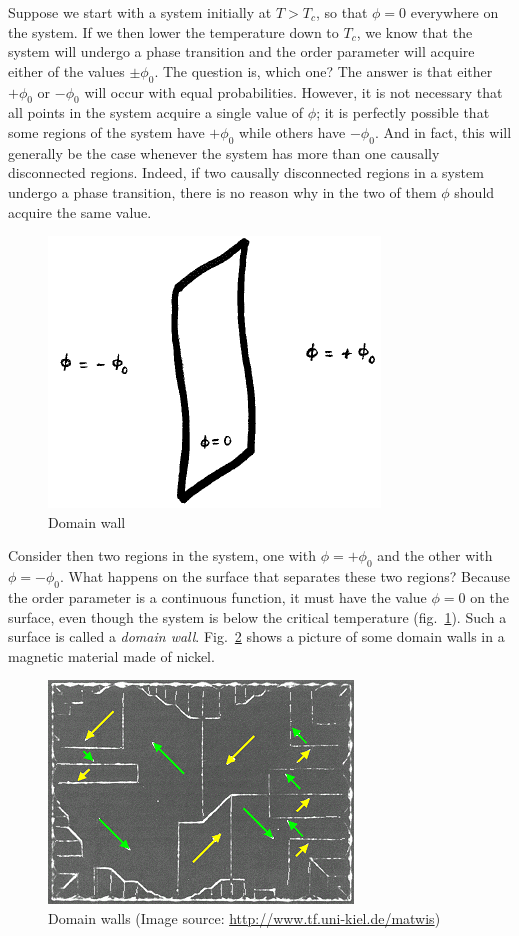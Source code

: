 Suppose we start with a system initially at $T>T_c$, so that $\phi=0$ everywhere on the system. If we then lower the temperature down to $T_c$, we know that the system will undergo a phase transition and the order parameter will acquire either of the values $\pm\phi_0$. The question is, which one? The answer is that either $+\phi_0$ or $-\phi_0$ will occur with equal probabilities. However, it is not necessary that all points in the system acquire a single value of $\phi$; it is perfectly possible that some regions of the system have $+\phi_0$ while others have $-\phi_0$. And in fact, this will generally be the case whenever the system has more than one causally disconnected regions. Indeed, if two causally disconnected regions in a system undergo a phase transition, there is no reason why in the two of them $\phi$ should acquire the same value.
\begin{figure}[ht]
\begin{center}
\includegraphics[scale=0.6]{Draw/lec12_7.png}
\end{center}
\caption{Domain wall}
\label{fig:lec12_7}
\end{figure}

Consider then two regions in the system, one with $\phi=+\phi_0$ and the other with $\phi=-\phi_0$. What happens on the surface that separates these two regions? Because the order parameter is a continuous function, it must have the value $\phi=0$ on the surface, even though the system is below the critical temperature (fig.\ \ref{fig:lec12_7}). Such a surface is called a {\it domain wall}. Fig.\ \ref{fig:lec12_1} shows a picture of some domain walls in a magnetic material made of nickel.
\begin{figure}[ht]
\begin{center}
\includegraphics[scale=0.75]{Draw/lec12_1.png}
\end{center}
\caption{Domain walls (Image source: \url{http://www.tf.uni-kiel.de/matwis})}
\label{fig:lec12_1}
\end{figure}

